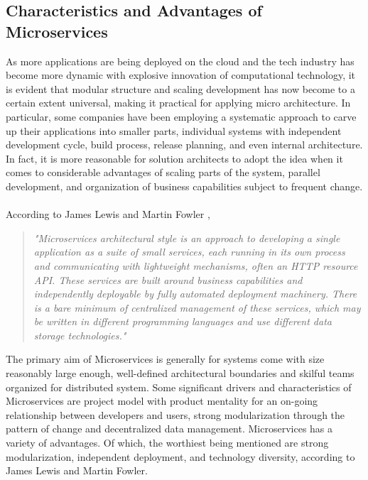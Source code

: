 \documentclass[a4paper]{book}
\begin{document}
\subsection{Characteristics and Advantages of Microservices} \label{Characteristics and Advantages of Microservices}
As more applications are being deployed on the cloud and the tech industry has become more dynamic with explosive innovation of computational technology, it is evident that modular structure and scaling development has now become to a certain extent universal, making it practical for applying micro architecture. In particular, some companies have been employing a systematic approach to carve up their applications into smaller parts, individual systems with independent development cycle, build process, release planning, and even internal architecture. In fact, it is more reasonable for solution architects to adopt the idea when it comes to considerable advantages of scaling parts of the system, parallel development, and organization of business capabilities subject to frequent change. 
\\ \\
According to James Lewis and Martin Fowler , 
\begin{quote}
    \textit{"Microservices architectural style is an approach to developing a single application as a suite of small services, each running in its own process and communicating with lightweight mechanisms, often an HTTP resource API. These services are built around business capabilities and independently deployable by fully automated deployment machinery. There is a bare minimum of centralized management of these services, which may be written in different programming languages and use different data storage technologies."} \cite{Lew14}
\end{quote}
The primary aim of Microservices is generally for systems come with size reasonably large enough, well-defined architectural boundaries \cite{BoundedContext} and skilful teams organized for distributed system. Some significant drivers and characteristics of Microservices are project model with product mentality for an on-going relationship between developers and users, strong modularization through the pattern of change and decentralized data management. Microservices has a variety of advantages. Of which, the worthiest being mentioned are strong modularization, independent deployment, and technology diversity, according to James Lewis and Martin Fowler. \cite{Lew14}
\end{document}
